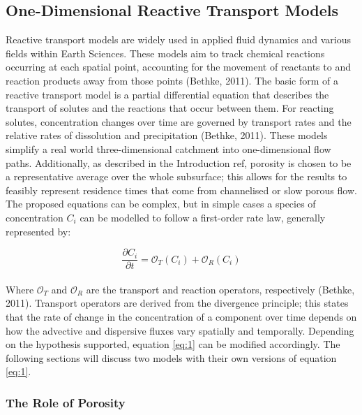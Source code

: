 \subsection{One-Dimensional Reactive Transport Models}

Reactive transport models are widely used in applied fluid dynamics and various fields within Earth Sciences. These models aim to track chemical reactions occurring at each spatial point, accounting for the movement of reactants to and reaction products away from those points (Bethke, 2011). The basic form of a reactive transport model is a partial differential equation that describes the transport of solutes and the reactions that occur between them. For reacting solutes, concentration changes over time are governed by transport rates and the relative rates of dissolution and precipitation (Bethke, 2011).
These models simplify a real world three-dimensional catchment into one-dimensional flow paths. Additionally, as described in the Introduction ref, porosity is chosen to be a representative average over the whole subsurface; this allows for the results to feasibly represent residence times that come from channelised or slow porous flow. The proposed equations can be complex, but in simple cases a species of concentration $C_i$ can be modelled to follow a first-order rate law, generally represented by:

\begin{equation}
    \frac{\partial C_i}{\partial t} = \mathcal{O}_{T}(C_i) + \mathcal{O}_{R}(C_i)
    \label{eq:1}
\end{equation}\\


Where \(\mathcal{O}_{T}\) and \(\mathcal{O}_{R}\) are the transport and reaction operators, respectively (Bethke, 2011). Transport operators are derived from the divergence principle; this states that the rate of change in the concentration of a component over time depends on how the advective and dispersive fluxes vary spatially and temporally. Depending on the hypothesis supported, equation \ref{eq:1} can be modified accordingly. The following sections will discuss two models with their own versions of equation \ref{eq:1}.

\subsubsection*{The Role of Porosity}


